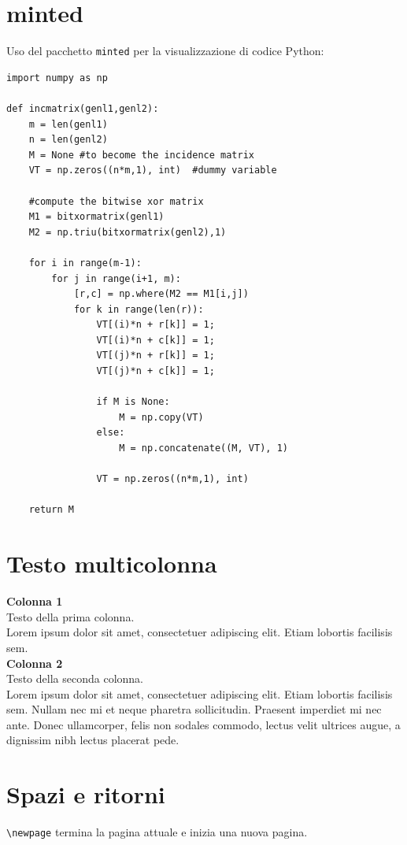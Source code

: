 \documentclass[envcountsame,envcountchap]{svmono}
\begin{document}
\section{minted}
Uso del pacchetto {\tt minted} per la visualizzazione di codice Python:
\begin{verbatim}
import numpy as np
    
def incmatrix(genl1,genl2):
    m = len(genl1)
    n = len(genl2)
    M = None #to become the incidence matrix
    VT = np.zeros((n*m,1), int)  #dummy variable
    
    #compute the bitwise xor matrix
    M1 = bitxormatrix(genl1)
    M2 = np.triu(bitxormatrix(genl2),1) 

    for i in range(m-1):
        for j in range(i+1, m):
            [r,c] = np.where(M2 == M1[i,j])
            for k in range(len(r)):
                VT[(i)*n + r[k]] = 1;
                VT[(i)*n + c[k]] = 1;
                VT[(j)*n + r[k]] = 1;
                VT[(j)*n + c[k]] = 1;
                
                if M is None:
                    M = np.copy(VT)
                else:
                    M = np.concatenate((M, VT), 1)
                
                VT = np.zeros((n*m,1), int)
    
    return M
\end{verbatim}


\section{Testo multicolonna}

\begin{multicols}{2}
    \textbf{Colonna 1}\\
    Testo della prima colonna.\\
    Lorem ipsum dolor sit amet, consectetuer adipiscing elit. Etiam lobortis facilisis sem.
    \columnbreak\\
    \textbf{Colonna 2}\\
    Testo della seconda colonna.\\
    Lorem ipsum dolor sit amet, consectetuer adipiscing elit. Etiam lobortis facilisis sem. Nullam nec mi et neque pharetra sollicitudin. Praesent imperdiet mi nec ante. Donec ullamcorper, felis non sodales commodo, lectus velit ultrices augue, a dignissim nibh lectus placerat pede.
\end{multicols}

\newpage
\section{Spazi e ritorni}
{\tt \textbackslash newpage} termina la pagina attuale e inizia una nuova pagina.
\end{document}
